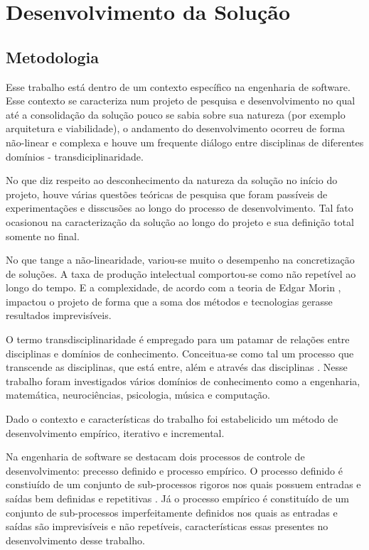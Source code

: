 \chapter{Desenvolvimento da Solução}
\label{chap:solucaocompleta}

\section{Metodologia}

Esse trabalho está dentro de um contexto específico na engenharia de software. Esse contexto se caracteriza num projeto de pesquisa e desenvolvimento no qual até a consolidação da solução pouco se sabia sobre sua natureza (por exemplo arquitetura e viabilidade), o andamento do desenvolvimento ocorreu de forma não-linear e complexa e houve um frequente diálogo entre disciplinas de diferentes domínios - transdiciplinaridade.

No que diz respeito ao desconhecimento da natureza da solução no início do projeto, houve várias questões teóricas de pesquisa que foram passíveis de experimentações e disscusões ao longo do processo de desenvolvimento. Tal fato ocasionou na caracterização da solução ao longo do projeto e sua definição total somente no final.

No que tange a não-linearidade, variou-se muito o desempenho na concretização de soluções. A taxa de produção intelectual comportou-se como não repetível ao longo do tempo. E a complexidade, de acordo com a teoria de Edgar Morin \cite{morin}, impactou o projeto de forma que a soma dos métodos e tecnologias gerasse resultados imprevisíveis.

O termo transdisciplinaridade é empregado para um patamar de relações entre disciplinas e domínios de conhecimento. Conceitua-se como tal um processo que transcende as disciplinas, que está entre, além e através das disciplinas \cite{criatividade}. Nesse trabalho foram investigados vários domínios de conhecimento como a engenharia, matemática, neurociências, psicologia, música e computação.

Dado o contexto e características do trabalho foi estabelicido um método de desenvolvimento empírico, iterativo e incremental.

Na engenharia de software se destacam dois processos de controle de desenvolvimento: precesso definido e processo empírico. O processo definido é constiuído de um conjunto de sub-processos rigoros nos quais possuem entradas e saídas bem definidas e repetitivas \cite{rup}. Já o processo empírico é constituído de um conjunto de sub-processos imperfeitamente definidos nos quais as entradas e saídas são imprevisíveis e não repetíveis, características essas presentes no desenvolvimento desse trabalho.

